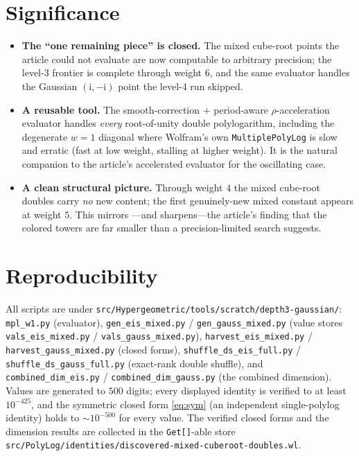\documentclass[11pt]{article}
\newcommand{\iu}{\mathrm{i}}
\newcommand{\code}[1]{\texttt{\small #1}}
\theoremstyle{plain}
\theoremstyle{remark}
\begin{document}
\section{Significance}\label{sec:sig}

\begin{itemize}
\item \textbf{The ``one remaining piece'' is closed.} The mixed cube-root points the article could not
  evaluate are now computable to arbitrary precision; the level-3 frontier is complete through weight
  $6$, and the same evaluator handles the Gaussian $(\iu,-\iu)$ point the level-4 run skipped.
\item \textbf{A reusable tool.} The smooth-correction $+$ period-aware $\rho$-acceleration evaluator
  handles \emph{every} root-of-unity double polylogarithm, including the degenerate $w=1$ diagonal where
  Wolfram's own \texttt{MultiplePolyLog} is slow and erratic (fast at low weight, stalling at higher
  weight). It is the natural companion to the article's accelerated evaluator for the oscillating case.
\item \textbf{A clean structural picture.} Through weight $4$ the mixed cube-root doubles carry
  \emph{no} new content; the first genuinely-new mixed constant appears at weight $5$. This mirrors
  ---and sharpens---the article's finding that the colored towers are far smaller than a
  precision-limited search suggests.
\end{itemize}

\section*{Reproducibility}
\sloppy
All scripts are under \code{src/Hypergeometric/tools/scratch/depth3-gaussian/}: \code{mpl\_w1.py}
(evaluator), \code{gen\_eis\_mixed.py} / \code{gen\_gauss\_mixed.py} (value stores \code{vals\_eis\_mixed.py}
/ \code{vals\_gauss\_mixed.py}), \code{harvest\_eis\_mixed.py} / \code{harvest\_gauss\_mixed.py} (closed
forms), \code{shuffle\_ds\_eis\_full.py} / \code{shuffle\_ds\_gauss\_full.py} (exact-rank double shuffle),
and \code{combined\_dim\_eis.py} / \code{combined\_dim\_gauss.py} (the combined dimension). Values are
generated to $500$ digits; every displayed identity is verified to at least $10^{-425}$, and the
symmetric closed form \eqref{eq:sym} (an independent single-polylog identity) holds to ${\sim}10^{-500}$
for every value. The verified closed forms and the dimension results are collected in the
\texttt{Get[]}-able store \code{src/PolyLog/identities/discovered-mixed-cuberoot-doubles.wl}.
\end{document}
